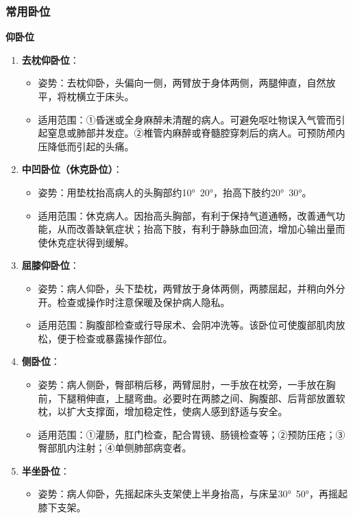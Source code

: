 \documentclass[11pt, a4paper]{ctexart}
\begin{document}
\subsubsection{常用卧位}
\textbf{仰卧位}
\begin{enumerate}
    \item \textbf{去枕仰卧位}：
    \begin{itemize}
        \item 姿势：去枕仰卧，头偏向一侧，两臂放于身体两侧，两腿伸直，自然放平，将枕横立于床头。
        \item 适用范围：①昏迷或全身麻醉未清醒的病人。可避免呕吐物误入气管而引起窒息或肺部并发症。②椎管内麻醉或脊髓腔穿刺后的病人。可预防颅内压降低而引起的头痛。
    \end{itemize}
    \item \textbf{中凹卧位（休克卧位）}：
    \begin{itemize}
        \item 姿势：用垫枕抬高病人的头胸部约10°~20°，抬高下肢约20°~30°。
        \item 适用范围：休克病人。因抬高头胸部，有利于保持气道通畅，改善通气功能，从而改善缺氧症状；抬高下肢，有利于静脉血回流，增加心输出量而使休克症状得到缓解。
    \end{itemize}
    \item \textbf{屈膝仰卧位}：
    \begin{itemize}
        \item 姿势：病人仰卧，头下垫枕，两臂放于身体两侧，两膝屈起，并稍向外分开。检查或操作时注意保暖及保护病人隐私。
        \item 适用范围：胸腹部检查或行导尿术、会阴冲洗等。该卧位可使腹部肌肉放松，便于检查或暴露操作部位。
    \end{itemize}
    \item \textbf{侧卧位}：
    \begin{itemize}
        \item 姿势：病人侧卧，臀部稍后移，两臂屈肘，一手放在枕旁，一手放在胸前，下腿稍伸直，上腿弯曲。必要时在两膝之间、胸腹部、后背部放置软枕，以扩大支撑面，增加稳定性，使病人感到舒适与安全。
        \item 适用范围：①灌肠，肛门检查，配合胃镜、肠镜检查等；②预防压疮；③臀部肌内注射；④单侧肺部病变者。
    \end{itemize}
    \item \textbf{半坐卧位}：
    \begin{itemize}
        \item 姿势：病人仰卧，先摇起床头支架使上半身抬高，与床呈30°~50°，再摇起膝下支架。

\end{itemize}
\end{enumerate}
\end{document}
